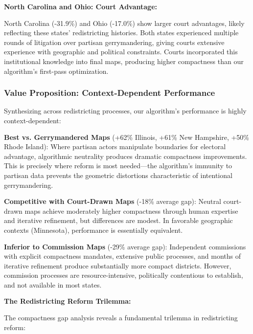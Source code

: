 \textbf{North Carolina and Ohio: Court Advantage:}

North Carolina (-31.9\%) and Ohio (-17.0\%) show larger court advantages, likely reflecting these states' redistricting histories. Both states experienced multiple rounds of litigation over partisan gerrymandering, giving courts extensive experience with geographic and political constraints. Courts incorporated this institutional knowledge into final maps, producing higher compactness than our algorithm's first-pass optimization.

\subsubsection{Value Proposition: Context-Dependent Performance}

Synthesizing across redistricting processes, our algorithm's performance is highly context-dependent:

\textbf{Best vs. Gerrymandered Maps} (+62\% Illinois, +61\% New Hampshire, +50\% Rhode Island):
Where partisan actors manipulate boundaries for electoral advantage, algorithmic neutrality produces dramatic compactness improvements. This is precisely where reform is most needed—the algorithm's immunity to partisan data prevents the geometric distortions characteristic of intentional gerrymandering.

\textbf{Competitive with Court-Drawn Maps} (-18\% average gap):
Neutral court-drawn maps achieve moderately higher compactness through human expertise and iterative refinement, but differences are modest. In favorable geographic contexts (Minnesota), performance is essentially equivalent.

\textbf{Inferior to Commission Maps} (-29\% average gap):
Independent commissions with explicit compactness mandates, extensive public processes, and months of iterative refinement produce substantially more compact districts. However, commission processes are resource-intensive, politically contentious to establish, and not available in most states.

\textbf{The Redistricting Reform Trilemma:}

The compactness gap analysis reveals a fundamental trilemma in redistricting reform:

